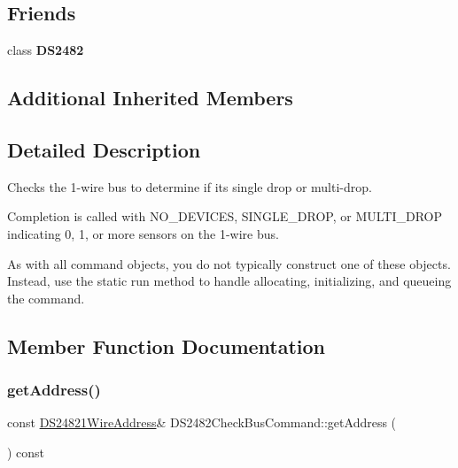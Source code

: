 \subsection*{Friends}
\begin{DoxyCompactItemize}
\item 
\mbox{\label{class_d_s2482_check_bus_command_afeaf69274324e8dbeebede05c02d9c18}} 
class {\bfseries D\+S2482}
\end{DoxyCompactItemize}
\subsection*{Additional Inherited Members}


\subsection{Detailed Description}
Checks the 1-\/wire bus to determine if it\textquotesingle{}s single drop or multi-\/drop. 

Completion is called with N\+O\+\_\+\+D\+E\+V\+I\+C\+ES, S\+I\+N\+G\+L\+E\+\_\+\+D\+R\+OP, or M\+U\+L\+T\+I\+\_\+\+D\+R\+OP indicating 0, 1, or more sensors on the 1-\/wire bus.

As with all command objects, you do not typically construct one of these objects. Instead, use the static run method to handle allocating, initializing, and queueing the command. 

\subsection{Member Function Documentation}
\mbox{\label{class_d_s2482_check_bus_command_ac768c4e5d7bae840e451323cabc3c2de}} 
\subsubsection{\texorpdfstring{get\+Address()}{getAddress()}}
{\footnotesize\ttfamily const \mbox{\hyperlink{class_d_s24821_wire_address}{D\+S24821\+Wire\+Address}}\& D\+S2482\+Check\+Bus\+Command\+::get\+Address (\begin{DoxyParamCaption}{ }\end{DoxyParamCaption}) const\hspace{0.3cm}{\ttfamily [inline]}}



